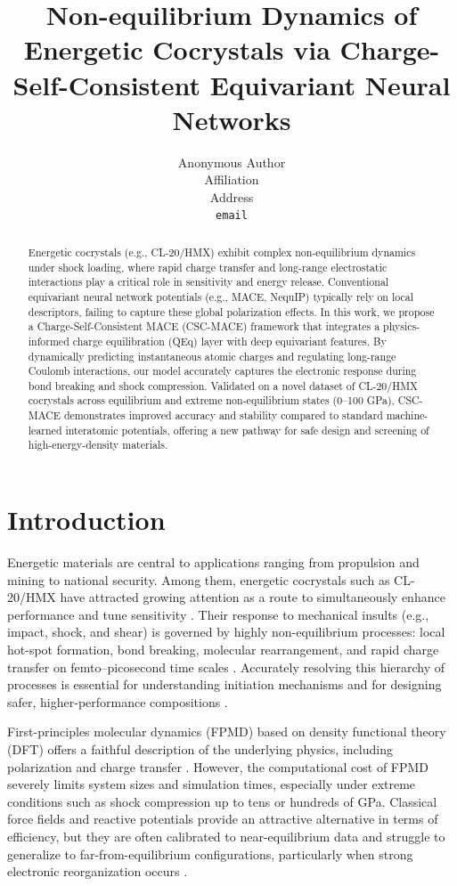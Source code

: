 \documentclass{article}
\title{Non-equilibrium Dynamics of Energetic Cocrystals via Charge-Self-Consistent Equivariant Neural Networks}
\author{%
  Anonymous Author \\
  Affiliation \\
  Address \\
  \texttt{email} \\
}
\date{}
\begin{document}
\maketitle

\begin{abstract}
Energetic cocrystals (e.g., CL-20/HMX) exhibit complex non-equilibrium dynamics under shock loading, where rapid charge transfer and long-range electrostatic interactions play a critical role in sensitivity and energy release. Conventional equivariant neural network potentials (e.g., MACE, NequIP) typically rely on local descriptors, failing to capture these global polarization effects. In this work, we propose a Charge-Self-Consistent MACE (CSC-MACE) framework that integrates a physics-informed charge equilibration (QEq) layer with deep equivariant features. By dynamically predicting instantaneous atomic charges and regulating long-range Coulomb interactions, our model accurately captures the electronic response during bond breaking and shock compression. Validated on a novel dataset of CL-20/HMX cocrystals across equilibrium and extreme non-equilibrium states (0--100 GPa), CSC-MACE demonstrates improved accuracy and stability compared to standard machine-learned interatomic potentials, offering a new pathway for safe design and screening of high-energy-density materials.
\end{abstract}

\section{Introduction}
\label{sec:intro}

Energetic materials are central to applications ranging from propulsion and mining to national security. Among them, energetic cocrystals such as CL-20/HMX have attracted growing attention as a route to simultaneously enhance performance and tune sensitivity \cite{zhang2015cocrystals,bolton2008molecular}. Their response to mechanical insults (e.g., impact, shock, and shear) is governed by highly non-equilibrium processes: local hot-spot formation, bond breaking, molecular rearrangement, and rapid charge transfer on femto–picosecond time scales \cite{dlott1999ultrafast,taraszon1997mechanism}. Accurately resolving this hierarchy of processes is essential for understanding initiation mechanisms and for designing safer, higher-performance compositions \cite{kuklja2003initiation}.

First-principles molecular dynamics (FPMD) based on density functional theory (DFT) offers a faithful description of the underlying physics, including polarization and charge transfer \cite{kresse1996efficient}. However, the computational cost of FPMD severely limits system sizes and simulation times, especially under extreme conditions such as shock compression up to tens or hundreds of GPa. Classical force fields and reactive potentials provide an attractive alternative in terms of efficiency, but they are often calibrated to near-equilibrium data and struggle to generalize to far-from-equilibrium configurations, particularly when strong electronic reorganization occurs \cite{van2001reaxff,menikoff2016shock}.
\end{document}
